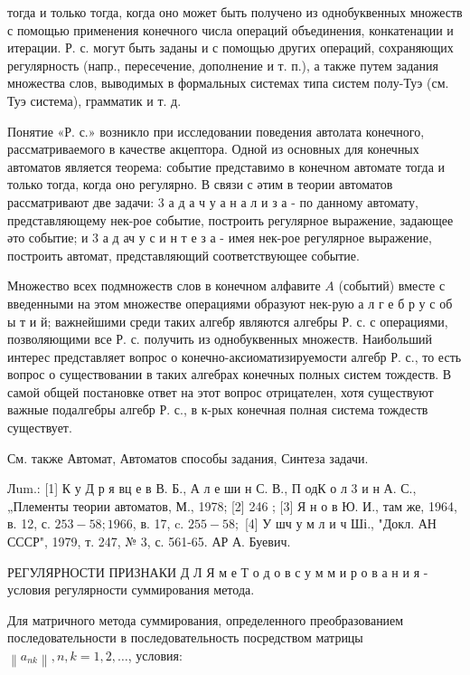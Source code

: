 \documentclass[10pt]{article}
\begin{document}
тогда и только тогда, когда оно может быть получено из однобуквенных множеств с помощью применения конечного числа операций объединения, конкатенации и итерации. Р. с. могут быть заданы и с помощью других операций, сохраняющих регулярность (напр., пересечение, дополнение и т. п.), а также путем задания множества слов, выводимых в формальных системах типа систем полу-Туэ (см. Туэ система), грамматик и т. д.



Понятие «Р. с.» возникло при исследовании поведения автолата конечного, рассматриваемого в качестве акцептора. Одной из основных для конечных автоматов является теорема: событие представимо в конечном автомате тогда и только тогда, когда оно регулярно. В связи с әтим в теории автоматов рассматривают две задачи: 3 а д а ч у а н а л и з а - по данному автомату, представляющему нек-рое событие, построить регулярное выражение, задающее әто событие; и 3 а д ач у с и н т е з а - имея нек-рое регулярное выражение, построить автомат, представляющий соответствующее событие.



Множество всех подмножеств слов в конечном алфавите $A$ (событий) вместе с введенными на этом множестве операциями образуют нек-рую а л г е б р у с об ы т и й; важнейшими среди таких алгебр являются алгебры Р. с. с операциями, позволяющими все Р. с. получить из однобуквенных множеств. Наибольший интерес представляет вопрос о конечно-аксиоматизируемости алгебр Р. с., то есть вопрос о существовании в таких алгебрах конечных полных систем тождеств. В самой общей постановке ответ на этот вопрос отрицателен, хотя существуют важные подалгебры алгебр Р. с., в к-рых конечная полная система тождеств существует.



См. также Автомат, Автоматов способы задания, Синтеза задачи.



Лum.: [1] К у Д р я вц е в В. Б., А л е ши н С. В., П одК о л 3 и н А. С., „Плементы теории автоматов, М., 1978; [2] 246 ; [3] Я н о в Ю. И., там же, 1964, в. 12, с. $253-58 ; 1966$, в. 17, c. $255-58 ;$ [4] У шч у м л и ч Ші., "Докл. АН СССР", 1979, т. 247, № 3, с. 561-65. АР А. Буевич.



РЕГУЛЯРНОСТИ ПРИЗНАКИ Д Л Я м е Т о д о в с у м м и р о в а н и я - условия регулярности суммирования метода.



Для матричного метода суммирования, определенного преобразованием последовательности в последовательность посредством матрицы $\left\|a_{n k}\right\|, n, k=1,2, \ldots$, условия:
\end{document}
